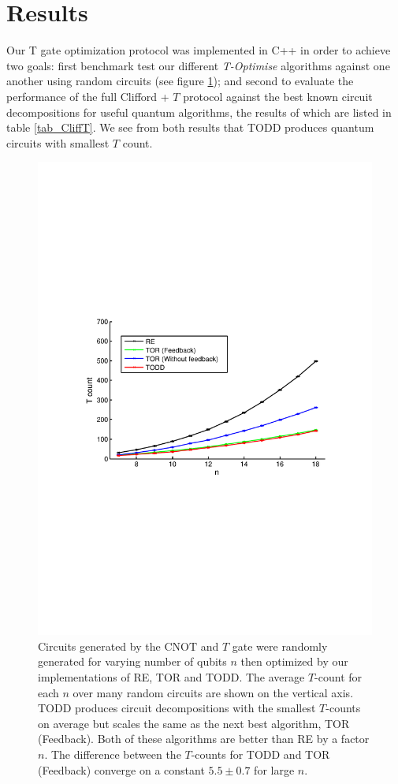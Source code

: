 \documentclass[notitlepage]{article}
\theoremstyle{definition}
\theoremstyle{problem}
\theoremstyle{lemma}
\begin{document}
		

	\FloatBarrier
	
	\section{Results}
	\label{sec_results}
	Our T gate optimization protocol was implemented in C++ in order to achieve two goals: first benchmark test our different \emph{T-Optimise} algorithms against one another using random circuits (see figure \ref{fig_random}); and second to evaluate the performance of the full Clifford + $T$ protocol against the best known circuit decompositions for useful quantum algorithms, the results of which are listed in table \ref{tab_CliffT}. We see from both results that TODD produces quantum circuits with smallest $T$ count.
	
	\begin{figure}[h!]
		\centering
		\includegraphics[width=0.5\linewidth, trim={3cm 10cm 3cm 9.5cm},clip]{random_benchmark}
		\caption{Circuits generated by the $\mathrm{CNOT}$ and $T$ gate were randomly generated for varying number of qubits $n$ then optimized by our implementations of RE, TOR and TODD. The average $T$-count for each $n$ over many random circuits are shown on the vertical axis. TODD produces circuit decompositions with the smallest $T$-counts on average but scales the same as the next best algorithm, TOR (Feedback). Both of these algorithms are better than RE by a factor $n$. The difference between the $T$-counts for TODD and TOR (Feedback) converge on a constant $5.5\pm 0.7$ for large $n$. 
		}
		\label{fig_random}
	\end{figure}
\end{document}
